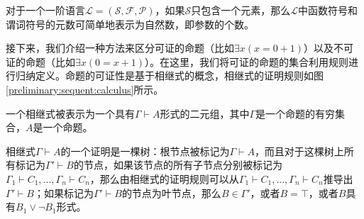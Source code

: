 	对于一个一阶语言$\mathcal{L}=(\mathcal{S}, \mathcal{F}, \mathcal{P})$，如果$\mathcal{S}$只包含一个元素，那么$\mathcal{L}$中函数符号和谓词符号的元数可简单地表示为自然数，即参数的个数。

接下来，我们介绍一种方法来区分可证的命题（比如$\exists x(x=0+1)$）以及不可证的命题（比如$\exists x(0=x+1)$）。在这里，我们将可证的命题的集合利用规则进行归纳定义。命题的可证性是基于相继式的概念，相继式的证明规则如图\ref{preliminary:sequent:calculus}所示。

\begin{definition}[相继式]
	一个相继式被表示为一个具有$\Gamma\vdash A$形式的二元组，其中$\Gamma$是一个命题的有穷集合，$A$是一个命题。
\end{definition}

\begin{definition}[相继式的证明]
	相继式$\Gamma\vdash A$的一个证明是一棵树：根节点被标记为$\Gamma\vdash A$，而且对于这棵树上所有标记为$\Gamma'\vdash B$的节点，如果该节点的所有子节点分别被标记为$\Gamma_1\vdash C_1,...,\Gamma_n\vdash C_n$，那么由相继式的证明规则可以从$\Gamma_1\vdash C_1,...,\Gamma_n\vdash C_n$推导出$\Gamma'\vdash B$；如果标记为$\Gamma'\vdash B$的节点为叶节点，那么$B\in \Gamma'$，或者$B=\top$，或者$B$具有$B_1\vee\neg B_1$形式。
\end{definition}

